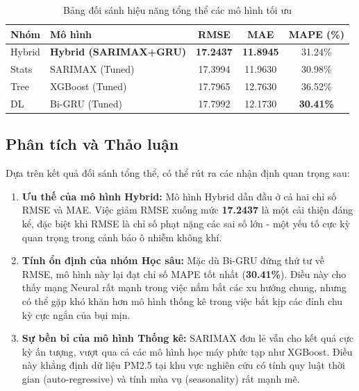\begin{table}[H]
    \centering
    \caption{Bảng đối sánh hiệu năng tổng thể các mô hình tối ưu}
    \label{tab:final_leaderboard}
    \begin{tabular}{|l|l|c|c|c|}
    \hline
    \textbf{Nhóm} & \textbf{Mô hình} & \textbf{RMSE} & \textbf{MAE} & \textbf{MAPE (\%)} \\ \hline
    Hybrid        & \textbf{Hybrid (SARIMAX+GRU)} & \textbf{17.2437} & \textbf{11.8945} & 31.24\% \\ \hline
    Stats         & SARIMAX (Tuned)              & 17.3994          & 11.9630          & 30.98\% \\ \hline
    Tree          & XGBoost (Tuned)              & 17.7965          & 12.7630          & 36.52\% \\ \hline
    DL            & Bi-GRU (Tuned)               & 17.7992          & 12.1730          & \textbf{30.41\%} \\ \hline
    \end{tabular}
\end{table}

\subsection{Phân tích và Thảo luận}

Dựa trên kết quả đối sánh tổng thể, có thể rút ra các nhận định quan trọng sau:
\begin{enumerate}
    \item \textbf{Ưu thế của mô hình Hybrid:} Mô hình Hybrid dẫn đầu ở cả hai chỉ số RMSE và MAE. Việc giảm RMSE xuống mức \textbf{17.2437} là một cải thiện đáng kể, đặc biệt khi RMSE là chỉ số phạt nặng các sai số lớn - một yếu tố cực kỳ quan trọng trong cảnh báo ô nhiễm không khí.
    \item \textbf{Tính ổn định của nhóm Học sâu:} Mặc dù Bi-GRU đứng thứ tư về RMSE, mô hình này lại đạt chỉ số MAPE tốt nhất (\textbf{30.41\%}). Điều này cho thấy mạng Neural rất mạnh trong việc nắm bắt các xu hướng chung, nhưng có thể gặp khó khăn hơn mô hình thống kê trong việc bắt kịp các đỉnh chu kỳ cực ngắn của bụi mịn.
    \item \textbf{Sự bền bỉ của mô hình Thống kê:} SARIMAX đơn lẻ vẫn cho kết quả cực kỳ ấn tượng, vượt qua cả các mô hình học máy phức tạp như XGBoost. Điều này khẳng định dữ liệu PM2.5 tại khu vực nghiên cứu có tính quy luật thời gian (auto-regressive) và tính mùa vụ (seasonality) rất mạnh mẽ.
\end{enumerate}


